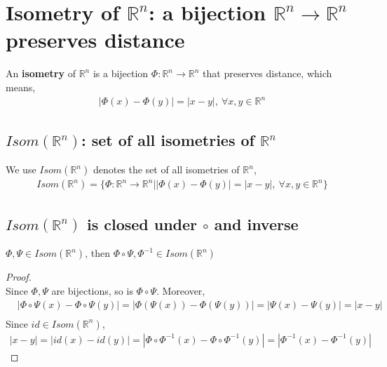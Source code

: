 \documentclass[11pt]{elegantbook}
\begin{document}
\section{Isometry of $\mathbb{R}^n$: a bijection $\mathbb{R}^n \rightarrow \mathbb{R}^n$ preserves distance}
An \textbf{isometry} of $\mathbb{R}^n$ is a bijection $\varPhi :\mathbb{R}^n \rightarrow \mathbb{R}^n$ that preserves distance, which means,
\begin{equation}
    \begin{aligned}
        |\varPhi(x)-\varPhi(y)|=|x-y|,\ \forall x,y\in \mathbb{R}^n
    \end{aligned}
    \nonumber
\end{equation}
\subsection{$Isom(\mathbb{R}^n)$: set of all isometries of $\mathbb{R}^n$}
We use $Isom(\mathbb{R}^n)$ denotes the set of all isometries of $\mathbb{R}^n$,
\begin{equation}
    \begin{aligned}
        Isom(\mathbb{R}^n)=\{\varPhi:\mathbb{R}^n \rightarrow \mathbb{R}^n | |\varPhi(x)-\varPhi(y)|=|x-y|,\ \forall x,y\in \mathbb{R}^n\}
    \end{aligned}
    \nonumber
\end{equation}

\subsection{$Isom(\mathbb{R}^n)$ is closed under $\circ$ and inverse}
\begin{proposition}
$\varPhi, \varPsi \in Isom(\mathbb{R}^n)$, then $\varPhi\circ\varPsi, \varPhi^{-1}\in Isom(\mathbb{R}^n)$
\end{proposition}
\begin{proof}
\quad\\
Since $\varPhi,\varPsi$ are bijections, so is $\varPhi\circ\varPsi$. Moreover,\\
\begin{equation}
    \begin{aligned}
        &|\varPhi\circ\varPsi(x)-\varPhi\circ\varPsi(y)|=|\varPhi(\varPsi(x))-\varPhi(\varPsi(y))|=|\varPsi(x)-\varPsi(y)|=|x-y|\\
    \end{aligned}
    \nonumber
\end{equation}
Since $id\in Isom (\mathbb{R}^n)$,
\begin{equation}
    \begin{aligned}
        |x-y|=|id(x)-id(y)|=|\varPhi\circ\varPhi^{-1}(x)-\varPhi\circ\varPhi^{-1}(y)|=|\varPhi^{-1}(x)-\varPhi^{-1}(y)|
    \end{aligned}
    \nonumber
\end{equation}
\end{proof}
\end{document}
